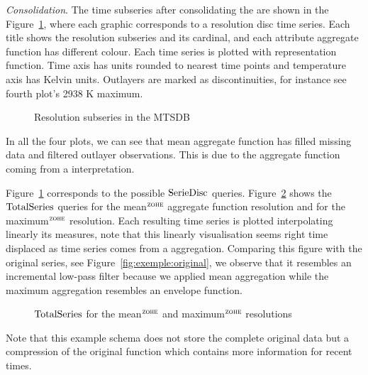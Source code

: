 \emph{Consolidation}. The time subseries after consolidating the
 are shown in the Figure~\ref{fig:exemple:4mrd}, where
each graphic corresponds to a resolution disc time series. Each title
shows the resolution subseries and its cardinal, and each attribute
aggregate function has different colour.  Each time series is plotted
with \zohe{} representation function. Time axis has  units
rounded to nearest time points and temperature axis has Kelvin
units. Outlayers are marked as discontinuities, for instance see
fourth plot's 2938 K maximum.

\begin{figure}[tp]
  \centering
  \caption{Resolution subseries in the MTSDB}
  \label{fig:exemple:4mrd}
\end{figure}

In all the four plots, we can see that mean aggregate function has
filled missing data and filtered outlayer observations. This is due
to the aggregate function coming from a \zohe{} interpretation.


Figure~\ref{fig:exemple:4mrd} corresponds to the possible $\operatorname{SerieDisc}$
queries. Figure~\ref{fig:exemple:4mrdtot} shows the $\operatorname{TotalSeries}$
queries for the mean$^{\zohe}$ aggregate function resolution and for
the maximum$^{\zohe}$ resolution.  Each resulting time series is
plotted interpolating linearly its measures, note that this linearly
visualisation seems right time displaced as time series comes from a
\zohe{} aggregation.  Comparing this figure with the original series,
see Figure~\ref{fig:exemple:original}, we observe that it resembles an
incremental low-pass filter because we applied mean aggregation while
the maximum aggregation resembles an envelope function.

\begin{figure}[tp]
  \centering
  \caption{$\operatorname{TotalSeries}$ for the mean$^{\zohe}$ and maximum$^{\zohe}$
    resolutions}
  \label{fig:exemple:4mrdtot}
\end{figure}


Note that this  example schema does not store the complete
original data but a compression of the original function which
contains more information for recent times.




